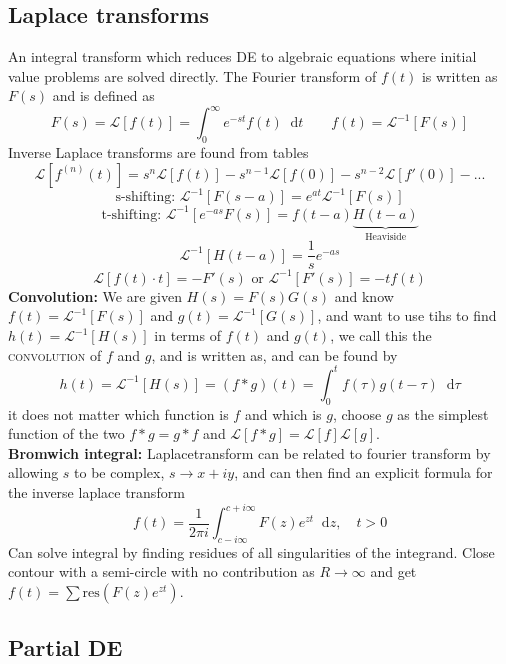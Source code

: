 \documentclass[a4paper, 10pt]{article}
\newcommand*\diff{\mathop{}\!\mathrm{d}}
\begin{document}
\begin{multicols*}{3}
\begin{mdframed}
\subsection*{Laplace transforms}
\end{mdframed}
An integral transform which reduces DE to algebraic equations where initial value problems are solved directly. The Fourier transform of $f(t)$ is written as $F(s)$ and is defined as
$$ F(s) = \mathcal{L}\left[ f(t) \right] = \int_0^\infty e^{-st} f(t) \diff t \qquad f(t) = \mathcal{L}^{-1}\left[ F(s) \right]$$
Inverse Laplace transforms are found from tables
$$ \mathcal{L}\left[ f^{(n)}(t) \right] = s^n\mathcal{L}\left[ f(t) \right]-s^{n-1}\mathcal{L}\left[ f(0) \right]-s^{n-2}\mathcal{L}\left[ f'(0) \right] - ...$$
$$ \text{s-shifting: }\mathcal{L}^{-1}\left[ F(s-a) \right] = e^{at}\mathcal{L}^{-1}\left[ F(s)\right] $$
$$ \text{t-shifting: }\mathcal{L}^{-1}\left[ e^{-as}F(s) \right] = f(t-a)\underbrace{H(t-a)}_{\text{Heaviside}}$$
$$ \mathcal{L}^{-1}\left[ H(t-a) \right] = \frac{1}{s}e^{-as}$$
$$ \mathcal{L}\left[ f(t)\cdot t \right] = -F'(s) \text{  or  } \mathcal{L}^{-1}\left[F'(s)\right] = -tf(t)$$
\textbf{Convolution:}
We are given $H(s) = F(s)G(s)$ and know $f(t) = \mathcal{L}^{-1}\left[F(s)\right]$ and $g(t) = \mathcal{L}^{-1}\left[G(s)\right]$, and want to use tihs to find $h(t) = \mathcal{L}^{-1}\left[H(s)\right]$ in terms of $f(t)$ and $g(t)$, we call this the \textsc{convolution} of $f$ and $g$, and is written as, and can be found by
$$h(t) = \mathcal{L}^{-1}\left[H(s)\right] = \left( f*g\right)(t) = \int_0^t f(\tau)g(t-\tau) \diff \tau$$
it does not matter which function is $f$ and which is $g$, choose $g$ as the simplest function of the two $f*g=g*f$ and $\mathcal{L}\left[f*g\right]=\mathcal{L}\left[f\right]\mathcal{L}\left[g\right]$.\\
\textbf{Bromwich integral:}
Laplacetransform can be related to fourier transform by allowing $s$ to be complex, $s\rightarrow x+iy$, and can then find an explicit formula for the inverse laplace transform
$$ f(t) = \frac{1}{2\pi i}\int_{c-i\infty}^{c+i\infty} F(z)e^{zt} \diff z, \quad t>0$$
Can solve integral by finding residues of all singularities of the integrand. Close contour with a semi-circle with no contribution as $R\rightarrow \infty$ and get $f(t) = \sum \text{res}(F(z)e^{zt})$.


\begin{mdframed}
\subsection*{Partial DE}
\end{mdframed}

\end{multicols*}
\end{document}
